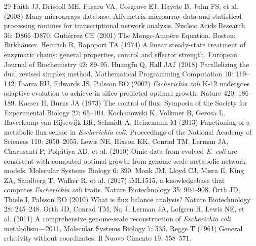 \begin{thebibliography}{29}
Faith JJ, Driscoll ME, Fusaro VA, Cosgrove EJ, Hayete B, Juhn FS, et al. (2008) Many microarrays database: Affymetrix microarray data and
             statistical processing routines for transcriptional network
             analysis. Nucleic Acids Research 36: D866--D870.
Guti{\'e}rrez CE (2001) The Monge-Amp{\`e}re Equation. Boston: Birkh{\"a}user.
Heinrich R, Rapoport TA (1974) A linear steady-state treatment of enzymatic chains: general
             properties, control and effector strength. European Journal of Biochemistry 42: 89--95.
Huangfu Q, Hall JAJ (2018) Parallelizing the dual revised simplex method. Mathematical Programming Computation 10: 119--142.
Ibarra RU, Edwards JS, Palsson BO (2002) \emph{Escherichia coli} {K-12} undergoes adaptive evolution to
             achieve in silico predicted optimal growth. Nature 420: 186--189.
Kacser H, Burns JA (1973) The control of flux. Symposia of the Society for Experimental Biology 27: 65--104.
Kochanowski K, Volkmer B, Gerosa L, Haverkamp van Rijsewijk BR, Schmidt A, Heinemann M (2013) Functioning of a metabolic flux sensor in \emph{Escherichia
             coli}. Proceedings of the National Academy of Sciences 110: 2050--2055.
Lewis NE, Hixson KK, Conrad TM, Lerman JA, Charusanti P, Polpitiya AD, et al. (2010) Omic data from evolved \emph{E. coli} are consistent with
             computed optimal growth from genome-scale metabolic network
             models. Molecular Systems Biology 6: 390.
Monk JM, Lloyd CJ, Misra E, King ZA, Sandberg T, Walker R, et al. (2017) i{ML1515}, a knowledgebase that computes \emph{Escherichia
             coli} traits. Nature Biotechnology 35: 904--908.
Orth JD, Thiele I, Palsson BO (2010) What is flux balance analysis? Nature Biotechnology 28: 245--248.
Orth JD, Conrad TM, Na J, Lerman JA, Lofgren H, Lewis NE, et al. (2011) A comprehensive genome-scale reconstruction of \emph{Escherichia coli} metabolism---2011. Molecular Systems Biology 7: 535.
Regge T (1961) General relativity without coordinates. Il Nuovo Cimento 19: 558--571.

\end{thebibliography}
